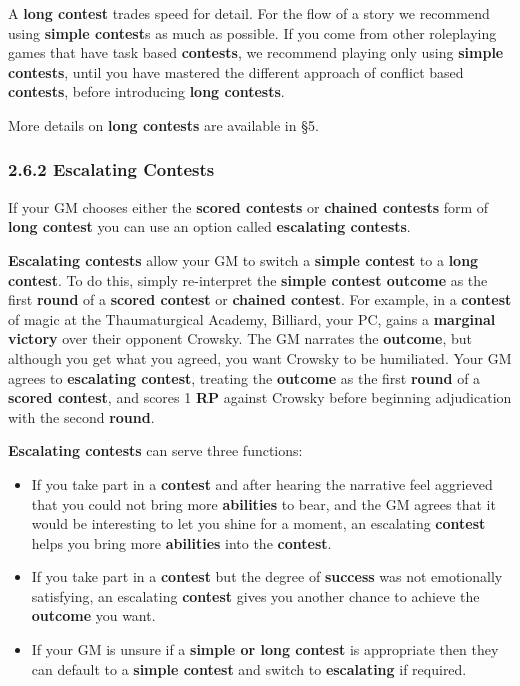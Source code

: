 \documentclass[
]{article}
\providecommand{\tightlist}{%
  \setlength{\itemsep}{0pt}\setlength{\parskip}{0pt}}
\begin{document}
A \textbf{long contest} trades speed for detail. For the flow of a story
we recommend using \textbf{simple contest}s as much as possible. If you
come from other roleplaying games that have task based
\textbf{contests}, we recommend playing only using \textbf{simple
contests}, until you have mastered the different approach of conflict
based \textbf{contests}, before introducing \textbf{long contests}.

More details on \textbf{long contests} are available in §5.

\hypertarget{escalating-contests}{%
\subsubsection{2.6.2 Escalating Contests}\label{escalating-contests}}

If your GM chooses either the \textbf{scored contests} or
\textbf{chained contests} form of \textbf{long contest} you can use an
option called \textbf{escalating contests}.

\textbf{Escalating contests} allow your GM to switch a \textbf{simple
contest} to a \textbf{long contest}. To do this, simply re-interpret the
\textbf{simple contest outcome} as the first \textbf{round} of a
\textbf{scored contest} or \textbf{chained contest}. For example, in a
\textbf{contest} of magic at the Thaumaturgical Academy, Billiard, your
PC, gains a \textbf{marginal victory} over their opponent Crowsky. The
GM narrates the \textbf{outcome}, but although you get what you agreed,
you want Crowsky to be humiliated. Your GM agrees to \textbf{escalating
contest}, treating the \textbf{outcome} as the first \textbf{round} of a
\textbf{scored contest}, and scores 1 \textbf{RP} against Crowsky before
beginning adjudication with the second \textbf{round}.

\textbf{Escalating contests} can serve three functions:

\begin{itemize}
\tightlist
\item
  If you take part in a \textbf{contest} and after hearing the narrative
  feel aggrieved that you could not bring more \textbf{abilities} to
  bear, and the GM agrees that it would be interesting to let you shine
  for a moment, an escalating \textbf{contest} helps you bring more
  \textbf{abilities} into the \textbf{contest}.
\item
  If you take part in a \textbf{contest} but the degree of
  \textbf{success} was not emotionally satisfying, an escalating
  \textbf{contest} gives you another chance to achieve the
  \textbf{outcome} you want.
\item
  If your GM is unsure if a \textbf{simple or long contest} is
  appropriate then they can default to a \textbf{simple contest} and
  switch to \textbf{escalating} if required.
\end{itemize}
\end{document}
